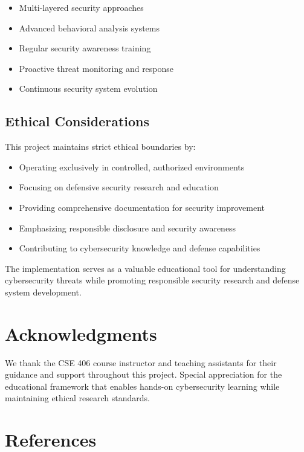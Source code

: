 \documentclass[12pt,a4paper]{article}
\begin{document}
\begin{itemize}
    \item Multi-layered security approaches
    \item Advanced behavioral analysis systems
    \item Regular security awareness training
    \item Proactive threat monitoring and response
    \item Continuous security system evolution
\end{itemize}

\subsection{Ethical Considerations}

This project maintains strict ethical boundaries by:

\begin{itemize}
    \item Operating exclusively in controlled, authorized environments
    \item Focusing on defensive security research and education
    \item Providing comprehensive documentation for security improvement
    \item Emphasizing responsible disclosure and security awareness
    \item Contributing to cybersecurity knowledge and defense capabilities
\end{itemize}

The implementation serves as a valuable educational tool for understanding cybersecurity threats while promoting responsible security research and defense system development.

\section*{Acknowledgments}

We thank the CSE 406 course instructor and teaching assistants for their guidance and support throughout this project. Special appreciation for the educational framework that enables hands-on cybersecurity learning while maintaining ethical research standards.

\section*{References}
\end{document}
